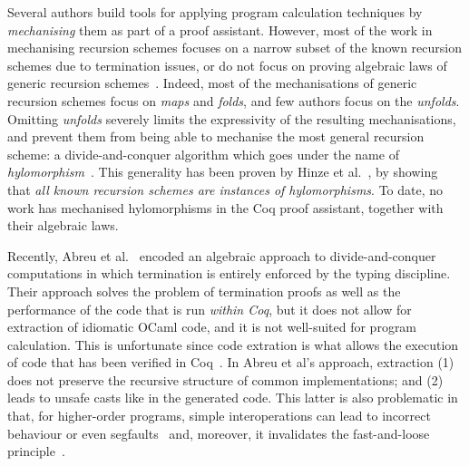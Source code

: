 \documentclass{llncs}
\begin{document}
Several authors build tools for applying program calculation techniques by
\emph{mechanising} them as part of a proof assistant. However, most of the work
in mechanising recursion schemes focuses on a narrow subset of the known
recursion schemes due to termination issues, or do not focus on proving
algebraic laws of generic recursion
schemes~\cite{10.1007/978-3-642-17796-5_10,MurataE19,larchey2022braga}.  Indeed,
most of the mechanisations of generic recursion schemes focus on \emph{maps} and
\emph{folds}, and few authors focus on the \emph{unfolds}. Omitting
\emph{unfolds} severely limits the expressivity of the resulting mechanisations,
and prevent them from being able to mechanise the most general recursion scheme:
a divide-and-conquer algorithm which goes under the name of
\emph{hylomorphism}~\cite{MeijerFP91,HuIT96}. This generality has been proven by
Hinze et al.~\cite{HinzeWG15}, by showing that \emph{all known  recursion
schemes are instances of hylomorphisms}.  To date, no work has mechanised
hylomorphisms in the Coq proof assistant, together with their algebraic laws.

Recently, Abreu et al.~\cite{AbreuDHJMS23} encoded an algebraic approach to
divide-and-conquer computations in which termination is entirely enforced by the
typing discipline. Their approach solves the problem of termination proofs as
well as the performance of the code that is run \emph{within Coq}, but it does
not allow for extraction of idiomatic OCaml code, and it is not well-suited for
program calculation. This is unfortunate since code extration is what allows the
execution of code that has been verified in
Coq~\cite{OnoHTNH11,Larchey-Wendling23,MiculanP12,Sakaguchi20}.  In Abreu et
al's approach, extraction (1) does not preserve the recursive structure of
common implementations; and (2) leads to unsafe casts like  in
the generated code. This latter is also problematic in that, for higher-order
programs, simple interoperations can lead to incorrect behaviour or even
segfaults~\cite{forster:hal-04329663} and, moreover, it invalidates the
fast-and-loose principle~\cite{DanielssonHJG06}.
\end{document}
